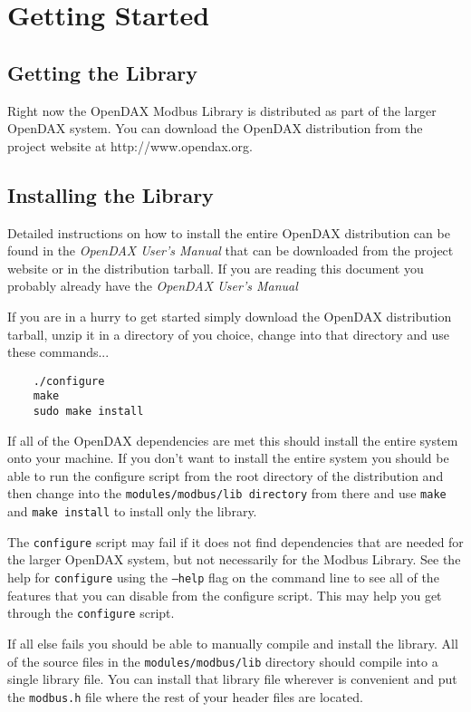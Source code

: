 \documentclass[10pt,letterpaper]{report}
\begin{document}
\chapter{Getting Started}
\section{Getting the Library}
Right now the OpenDAX Modbus Library is distributed as part of the larger OpenDAX system.  You can download the OpenDAX distribution from the project website at http://www.opendax.org.

\section{Installing the Library}
Detailed instructions on how to install the entire OpenDAX distribution can be found in the \textit{OpenDAX User's Manual} that can be downloaded from the project website or in the distribution tarball.  If you are reading this document you probably already have the \textit{OpenDAX User's Manual}

If you are in a hurry to get started simply download the OpenDAX distribution tarball, unzip it in a directory of you choice, change into that directory and use these commands...

\begin{verbatim}
    ./configure
    make
    sudo make install 
\end{verbatim} 

If all of the OpenDAX dependencies are met this should install the entire system onto your machine.  If you don't want to install the entire system you should be able to run the configure script from the root directory of the distribution and then change into the \texttt{modules/modbus/lib directory} from there and use \texttt{make} and \texttt{make install} to install only the library.

The \texttt{configure} script may fail if it does not find dependencies that are needed for the larger OpenDAX system, but not necessarily for the Modbus Library.  See the help for \texttt{configure} using the \texttt{--help} flag on the command line to see all of the features that you can disable from the configure script.  This may help you get through the \texttt{configure} script.

If all else fails you should be able to manually compile and install the library.  All of the source files in the \texttt{modules/modbus/lib} directory should compile into a single library file.  You can install that library file wherever is convenient and put the \texttt{modbus.h} file where the rest of your header files are located.
\end{document}
